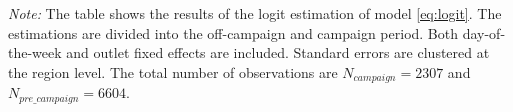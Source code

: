 \documentclass[12pt]{article}
\begin{document}
\begin{table}[!htb]
\begin{threeparttable}
			
				\caption*{\small  \textit{Note:} The table shows the results of the logit estimation of model \eqref{eq:logit}. The estimations are divided into the off-campaign and campaign period. Both day-of-the-week and outlet fixed effects are included. Standard errors are clustered at the region level. The total number of observations are $N_{campaign}=2307$ and  $N_{pre\_campaign}=6604$.}
			
		\end{threeparttable}
	\end{table}
	

\end{document}
